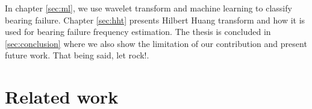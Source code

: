 \documentclass[../Main/thesis.tex]{subfiles}
\begin{document}
In chapter \ref{sec:ml}, we use wavelet transform and machine learning to classify bearing failure. Chapter \ref{sec:hht} presents Hilbert Huang transform and how it is used for bearing failure frequency estimation. The thesis is concluded in \ref{sec:conclusion} where we also show the limitation of our contribution and present future work. That being said, let rock!.
\section{Related work}
\label{sec:relatedwork}


\end{document}
